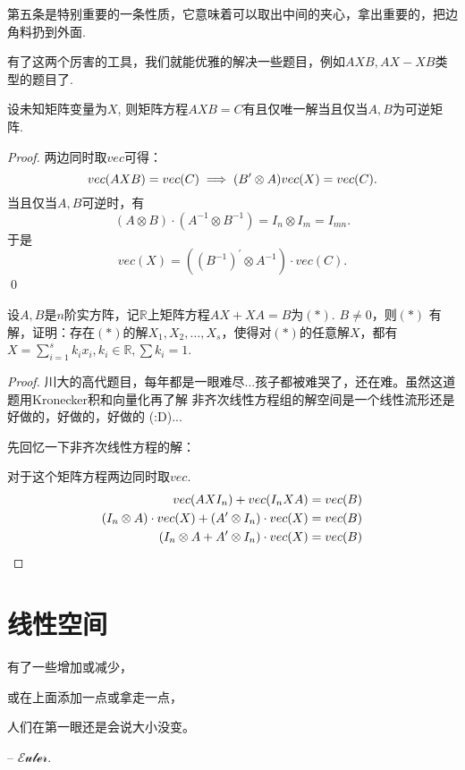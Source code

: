 \begin{remark}
	第五条是特别重要的一条性质，它意味着可以取出中间的夹心，拿出重要的，把边角料扔到外面.
\end{remark}

有了这两个厉害的工具，我们就能优雅的解决一些题目，例如$AXB,AX-XB$类型的题目了.

\begin{proposition}[夹心方程]
	设未知矩阵变量为$X$, 则矩阵方程$AXB=C$有且仅唯一解当且仅当$A,B$为可逆矩阵.
\end{proposition}

\begin{proof}
	两边同时取$vec$可得：
	$$
		vec(AXB)=vec(C) \implies (B^{\prime} \otimes A)vec(X) = vec(C).
	$$
	当且仅当$A,B$可逆时，有
	$$
		(A \otimes B) \cdot (A^{-1} \otimes B^{-1}) = 
		I_n \otimes I_m = I_{mn}.
	$$
	于是
	$$
		vec(X) = \left( (B^{-1})^\prime \otimes A^{-1} \right) \cdot vec(C).
	$$
	\qed{}
\end{proof}

\begin{ex}[川大 2014]
	设$A,B$是$n$阶实方阵，记$\mathbb{R}$上矩阵方程$AX+XA=B$为$(\ast)$. $B\neq0$，则$(\ast)$
	有解，证明：存在$(\ast)$的解$X_1, X_2, \dots, X_s$，使得对$(\ast)$的任意解$X$，都有
	$X=\sum_{i=1}^s k_i x_i,k_i \in \mathbb{R},\sum k_i=1$.
\end{ex}

\begin{proof}
	川大的高代题目，每年都是一眼难尽...孩子都被难哭了，还在难。虽然这道题用Kronecker积和向量化再了解
	非齐次线性方程组的解空间是一个线性流形还是好做的，好做的，好做的 (:D)...

	先回忆一下非齐次线性方程的解：

	对于这个矩阵方程两边同时取$vec$.
	\begin{align*}
		vec(AX I_n) + vec(I_n XA) &= vec(B) \\
		(I_n \otimes A) \cdot vec(X) + (A^{\prime} \otimes I_n) \cdot vec(X) &= vec(B) \\
		(I_n \otimes A + A^{\prime} \otimes I_n) \cdot vec(X) &= vec(B)
	\end{align*}


\end{proof}

\chapter{线性空间}

\begin{introduction}
	\item 有了一些增加或减少，
	\item 或在上面添加一点或拿走一点，
	\item 人们在第一眼还是会说大小没变。
	\item -- $\mathcal{Euler}$.
\end{introduction}


